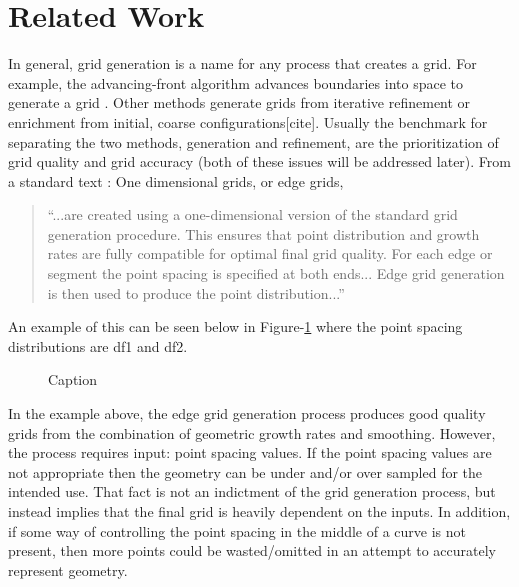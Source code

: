 \section{Related Work}
In general, grid generation is a name for any process that creates a grid.  
For example, the advancing-front algorithm advances boundaries into space 
to generate a grid \cite{lohner88}.  Other methods generate grids from 
iterative refinement or enrichment from initial, coarse 
configurations[cite].  Usually the benchmark for separating the two 
methods, generation and refinement, are the prioritization of grid quality 
and grid accuracy (both of these issues will be addressed later).  From a 
standard text \cite{thompson98}: One dimensional grids, or edge grids, 
\begin{quotation} \noindent ``...are created using a one-dimensional 
version of the standard grid generation procedure.  This ensures that 
point distribution and growth rates are fully compatible for optimal final 
grid quality.  For each edge or segment the point spacing is specified at 
both ends... Edge grid generation is then used to produce the point 
distribution...'' \end{quotation} An example of this can be seen below in Figure-\ref{EdgeGrid_HandbookOfGridGeneration} where the point spacing distributions are df1 and df2.

\begin{figure}[h!]
  \caption{\label{EdgeGrid_HandbookOfGridGeneration} Caption}
\end{figure}

\noindent In the example above, the edge grid generation process produces good quality grids from the combination of geometric growth rates and smoothing.  However, the process requires input: point spacing values.  If the point spacing values are not appropriate then the geometry can be under and/or over sampled for the intended use.  That fact is not an indictment of the grid generation process, but instead implies that the final grid is heavily dependent on the inputs.  In addition, if some way of controlling the point spacing in the middle of a curve is not present, then more points could be wasted/omitted in an attempt to accurately represent geometry.

